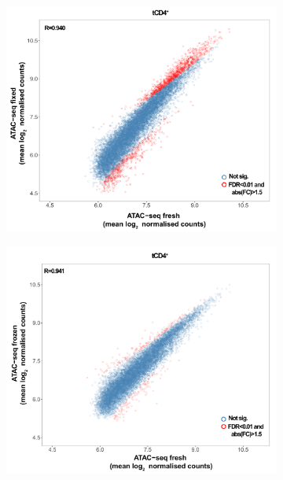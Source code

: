 \begin{figure}[H]
~
\begin{subfigure}[b]{0.45\textwidth} 
\centering
\includegraphics[width=\textwidth]{./Results1/pdfs/Core_ATAC_CD4_fresh_fixed_correlation_counts_small}%
\caption{}
\end{subfigure}
\begin{subfigure}[b]{0.45\textwidth} 
\centering
\includegraphics[width=\textwidth]{./Results1/pdfs/Core_ATAC_CD4_fresh_frozen_correlation_counts_small}
\caption{}

\end{subfigure}
\end{figure}
